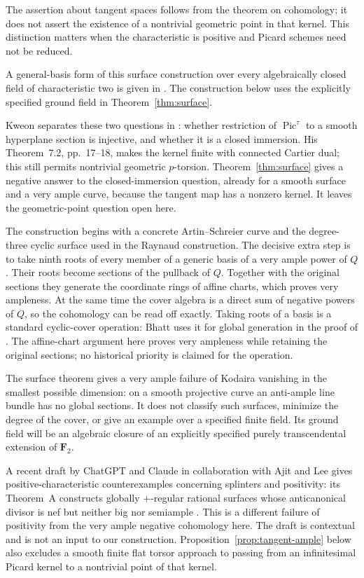 \documentclass[11pt]{article}
\theoremstyle{remark}\newtheorem{remark}[theorem]{Remark}
\newcommand{\F}{\mathbf F}
\newcommand{\Pic}{\operatorname{Pic}}
\begin{document}
The assertion about tangent spaces follows from the theorem on cohomology; it does not assert the existence of a nontrivial geometric point in that kernel. This distinction matters when the characteristic is positive and Picard schemes need not be reduced.

A general-basis form of this surface construction over every algebraically
closed field of characteristic two is given in
\cite[Theorem~1 and Sections~3--6, pp.~2, 4--8]{HexagonSurface}.
The construction below uses the explicitly specified ground field in
Theorem~\ref{thm:surface}.

Kweon separates these two questions in \cite[Question~7.7, arXiv v2 p.~19]{KweonNS}: whether restriction of $\Pic^\tau$ to a smooth hyperplane section is injective, and whether it is a closed immersion. His Theorem~7.2, pp.~17--18, makes the kernel finite with connected Cartier dual; this still permits nontrivial geometric $p$-torsion. Theorem~\ref{thm:surface} gives a negative answer to the closed-immersion question, already for a smooth surface and a very ample curve, because the tangent map has a nonzero kernel. It leaves the geometric-point question open here.

The construction begins with a concrete Artin--Schreier curve and the degree-three cyclic surface used in the Raynaud construction. The decisive extra step is to take ninth roots of every member of a generic basis of a very ample power of $Q$. Their roots become sections of the pullback of $Q$. Together with the original sections they generate the coordinate rings of affine charts, which proves very ampleness. At the same time the cover algebra is a direct sum of negative powers of $Q$, so the cohomology can be read off exactly. Taking roots of a basis is a standard cyclic-cover operation: Bhatt uses it for global generation in the proof of \cite[Proposition~7.2, p.~1771]{Bhatt}. The affine-chart argument here proves very ampleness while retaining the original sections; no historical priority is claimed for the operation.

The surface theorem gives a very ample failure of Kodaira vanishing in the smallest possible dimension: on a smooth projective curve an anti-ample line bundle has no global sections. It does not classify such surfaces, minimize the degree of the cover, or give an example over a specified finite field. Its ground field will be an algebraic closure of an explicitly specified purely transcendental extension of $\F_2$.

A recent draft by ChatGPT and Claude in collaboration with Ajit and Lee gives positive-characteristic counterexamples concerning splinters and positivity: its Theorem~A constructs globally $+$-regular rational surfaces whose anticanonical divisor is nef but neither big nor semiample \cite[Theorem~A, p.~2]{AjitLee}. This is a different failure of positivity from the very ample negative cohomology here. The draft is contextual and is not an input to our construction. Proposition~\ref{prop:tangent-ample} below also excludes a smooth finite flat torsor approach to passing from an infinitesimal Picard kernel to a nontrivial point of that kernel.
\end{document}
